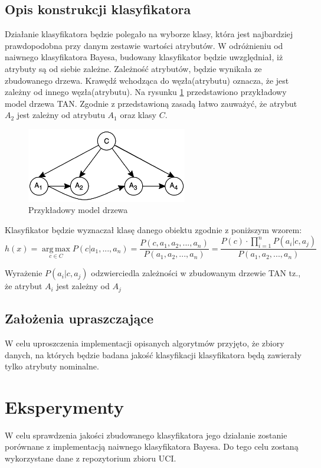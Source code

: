 \documentclass[paper=a4, fontsize=11pt]{scrartcl} %
\numberwithin{equation}{section} %
\numberwithin{figure}{section} %
\numberwithin{table}{section} %
\begin{document}
\subsection{Opis konstrukcji klasyfikatora}
Działanie klasyfikatora będzie polegało na wyborze klasy, która jest najbardziej prawdopodobna przy danym zestawie wartości atrybutów. W odróżnieniu od  naiwnego klasyfikatora Bayesa, budowany klasyfikator będzie uwzględniał, iż atrybuty są od siebie zależne. Zależność atrybutów, będzie wynikała ze zbudowanego drzewa. Krawędź wchodząca do węzła(atrybutu) oznacza, że jest zależny od innego węzła(atrybutu). Na rysunku \ref{fig:model_drzewa} przedstawiono przykładowy model drzewa TAN. Zgodnie z przedstawioną zasadą łatwo zauważyć, że atrybut $A_2$ jest zależny od atrybutu $A_1$ oraz klasy $C$.
\begin{figure}[h]
 \centering
 \includegraphics[width=70mm]{model1.png}
 \caption{Przykładowy model drzewa}
 \label{fig:model_drzewa}
\end{figure}

Klasyfikator będzie wyznaczał klasę danego obiektu zgodnie z poniższym wzorem:
\[h(x) = \operatorname*{arg\,max}_{c \in C} P(c|a_1,...,a_n)= \frac{P(c,a_1,a_2,...,a_n)}{P(a_1,a_2,...,a_n)}= 
\frac {P(c) \cdot \prod_{i=1}^{n} {P(a_i|c,a_j)}}{P(a_1,a_2,...,a_n)} \]

Wyrażenie $P(a_i|c,a_j)$ odzwierciedla zależności w zbudowanym drzewie TAN tz., że atrybut $A_i$ jest zależny od $A_j$

\subsection{Założenia upraszczające}

W celu uproszczenia implementacji opisanych algorytmów przyjęto, że zbiory danych, na których będzie badana jakość klasyfikacji klasyfikatora będą zawierały tylko atrybuty nominalne.

    

\section{Eksperymenty}   
W celu sprawdzenia jakości zbudowanego klasyfikatora jego działanie zostanie porównane z implementacją naiwnego klasyfikatora Bayesa. 
Do tego celu zostaną wykorzystane dane z repozytorium zbioru UCI.

\nocite{Bayesian_Network_Classifiers}

\nocite{*}

 
\end{document}
